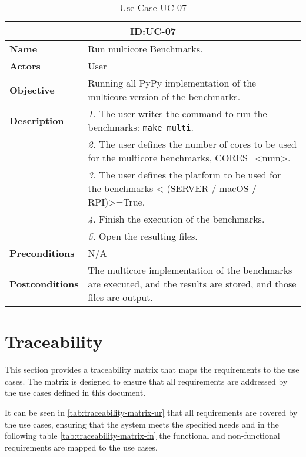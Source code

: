 \begin{table}[H]
    \centering
    \begin{tabular}{l p{10cm}}
        \toprule
        \multicolumn{2}{c}{\textbf{ID:\@ UC-07}} \\
        \toprule
        \textbf{Name}                         &  Run multicore Benchmarks. \\
        \textbf{Actors}                       &  User \\
        \textbf{Objective}                    &  Running all PyPy implementation of the multicore version of the benchmarks. \\
        \multirow{1}{*}{\textbf{Description}} & \textsl{1.} The user writes the command to run the benchmarks: \texttt{make multi}.\\
                                              & \textsl{2.} The user defines the number of cores to be used for the multicore benchmarks, CORES=<num>.\\
                                              & \textsl{3.} The user defines the platform to be used for the benchmarks < (SERVER / macOS / RPI)>=True.\\
                                              & \textsl{4.} Finish the execution of the benchmarks.\\
                                              & \textsl{5.} Open the resulting files.\\
        \textbf{Preconditions}                &  N/A \\
        \textbf{Postconditions}               &  The multicore implementation of the benchmarks are executed, and the results are stored, and those files are output. \\
    \end{tabular}
    \caption{Use Case UC-07}\label{tab:uc-07}
\end{table}



\section{Traceability}

This section provides a traceability matrix that maps the requirements to the use cases. The matrix is designed to ensure that all requirements are addressed by the use cases defined in this document.

It can be seen in \autoref{tab:traceability-matrix-ur} that all requirements are covered by the use cases, ensuring that the system meets the specified needs and in the following table \autoref{tab:traceability-matrix-fn} the functional and non-functional requirements are mapped to the use cases.

